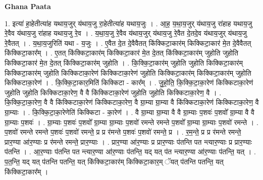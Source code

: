 \documentclass[17pt]{extarticle}
\begin{document}
\textbf{Ghana Paata } \newline

1. इत्या॑ हा॒हेतीत्या॑ह यथाय॒जुर् य॑थाय॒जु रा॒हेतीत्या॑ह यथाय॒जुः । . आ॒ह॒ य॒था॒य॒जुर् य॑थाय॒जु रा॑हाह यथाय॒जु रे॒वैव य॑थाय॒जु रा॑हाह यथाय॒जु रे॒व । . य॒था॒य॒जु रे॒वैव य॑थाय॒जुर् य॑थाय॒जु रे॒वैत दे॒तदे॒व य॑थाय॒जुर् य॑थाय॒जु रे॒वैतत् । . य॒था॒य॒जुरिति॑ यथा - य॒जुः । . ए॒वैत दे॒त दे॒वैवैतत् कि॑क्किटा॒कार॑म् किक्किटा॒कार॑ मे॒त दे॒वैवैतत् कि॑क्किटा॒कार᳚म् । . ए॒तत् कि॑क्किटा॒कार॑म् किक्किटा॒कार॑ मे॒त दे॒तत् कि॑क्किटा॒कार॑म् जुहोति जुहोति किक्किटा॒कार॑ मे॒त दे॒तत् कि॑क्किटा॒कार॑म् जुहोति । . कि॒क्कि॒टा॒कार॑म् जुहोति जुहोति किक्किटा॒कार॑म् किक्किटा॒कार॑म् जुहोति किक्किटाका॒रेण॑ किक्किटाका॒रेण॑ जुहोति किक्किटा॒कार॑म् किक्किटा॒कार॑म् जुहोति किक्किटाका॒रेण॑ । . कि॒क्कि॒टा॒कार॒मिति॑ किक्किटा - कार᳚म् । . जु॒हो॒ति॒ कि॒क्कि॒टा॒का॒रेण॑ किक्किटाका॒रेण॑ जुहोति जुहोति किक्किटाका॒रेण॒ वै वै कि॑क्किटाका॒रेण॑ जुहोति जुहोति किक्किटाका॒रेण॒ वै । . कि॒क्कि॒टा॒का॒रेण॒ वै वै कि॑क्किटाका॒रेण॑ किक्किटाका॒रेण॒ वै ग्रा॒म्या ग्रा॒म्या वै कि॑क्किटाका॒रेण॑ किक्किटाका॒रेण॒ वै ग्रा॒म्याः । . कि॒क्कि॒टा॒का॒रेणेति॑ किक्किटा - का॒रेण॑ । . वै ग्रा॒म्या ग्रा॒म्या वै वै ग्रा॒म्याः प॒शवः॑ प॒शवो᳚ ग्रा॒म्या वै वै ग्रा॒म्याः प॒शवः॑ । . ग्रा॒म्याः प॒शवः॑ प॒शवो᳚ ग्रा॒म्या ग्रा॒म्याः प॒शवो॑ रमन्ते रमन्ते प॒शवो᳚ ग्रा॒म्या ग्रा॒म्याः प॒शवो॑ रमन्ते । . प॒शवो॑ रमन्ते रमन्ते प॒शवः॑ प॒शवो॑ रमन्ते॒ प्र प्र र॑मन्ते प॒शवः॑ प॒शवो॑ रमन्ते॒ प्र । . र॒म॒न्ते॒ प्र प्र र॑मन्ते रमन्ते॒ प्रार॒ण्या आ॑र॒ण्याः प्र र॑मन्ते रमन्ते॒ प्रार॒ण्याः । . प्रार॒ण्या आ॑र॒ण्याः प्र प्रार॒ण्याः प॑तन्ति पत न्त्यार॒ण्याः प्र प्रार॒ण्याः प॑तन्ति । . आ॒र॒ण्याः प॑तन्ति पत न्त्यार॒ण्या आ॑र॒ण्याः प॑तन्ति॒ यद् यत् प॑त न्त्यार॒ण्या आ॑र॒ण्याः प॑तन्ति॒ यत् । . प॒त॒न्ति॒ यद् यत् प॑तन्ति पतन्ति॒ यत् कि॑क्किटा॒कार॑म् किक्किटा॒कार॒म् ॅयत् प॑तन्ति पतन्ति॒ यत् कि॑क्किटा॒कार᳚म् । \newline
\end{document}
